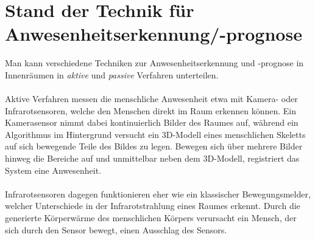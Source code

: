 \clearpage
\chapter{\textbf{Stand der Technik für Anwesenheitserkennung/-prognose}}\label{grundlagen}

Man kann verschiedene Techniken zur Anwesenheitserkennung und -prognose in Innenräumen in \textit{aktive} und
\textit{passive} Verfahren unterteilen. \\\\
Aktive Verfahren messen die menschliche Anwesenheit etwa mit 
Kamera- oder Infrarotsensoren, welche den Menschen direkt im Raum erkennen können. Ein Kamerasensor nimmt
dabei kontinuierlich Bilder des Raumes auf, während ein Algorithmus im Hintergrund versucht ein 3D-Modell 
eines menschlichen Skeletts auf sich bewegende Teile des Bildes zu legen. Bewegen sich über mehrere Bilder 
hinweg die Bereiche auf und unmittelbar neben dem 3D-Modell, registriert das System eine Anwesenheit.\\\\
Infrarotsensoren dagegen funktionieren eher wie ein klassischer Bewegungsmelder, welcher Unterschiede in der 
Infrarotstrahlung eines Raumes erkennt. Durch die generierte Körperwärme des menschlichen Körpers verursacht 
ein Mensch, der sich durch den Sensor bewegt, einen Ausschlag des Sensors.\\

